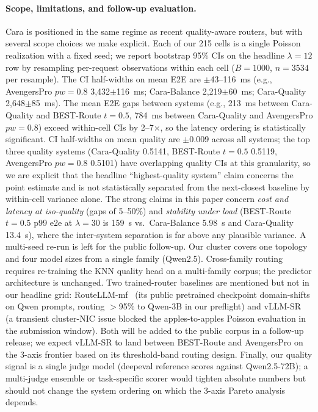 \documentclass[10pt]{article}
\begin{document}
\paragraph{Scope, limitations, and follow-up evaluation.}\label{sec:limitations}
Cara is positioned in the same regime as recent quality-aware routers, but with several scope choices we make explicit. Each of our 215 cells is a single Poisson realization with a fixed seed; we report bootstrap 95\% CIs on the headline $\lambda{=}12$ row by resampling per-request observations within each cell ($B{=}1000$, $n{=}3534$ per resample). The CI half-widths on mean E2E are $\pm$43--116~ms (e.g., AvengersPro $pw{=}0.8$ 3{,}432$\pm$116~ms; Cara-Balance 2{,}219$\pm$60~ms; Cara-Quality 2{,}648$\pm$85~ms). The mean E2E gaps between systems (e.g., 213~ms between Cara-Quality and BEST-Route $t{=}0.5$, 784~ms between Cara-Quality and AvengersPro $pw{=}0.8$) exceed within-cell CIs by 2--7$\times$, so the latency ordering is statistically significant. CI half-widths on mean quality are $\pm$0.009 across all systems; the top three quality systems (Cara-Quality 0.5141, BEST-Route $t{=}0.5$ 0.5119, AvengersPro $pw{=}0.8$ 0.5101) have overlapping quality CIs at this granularity, so we are explicit that the headline ``highest-quality system'' claim concerns the point estimate and is not statistically separated from the next-closest baseline by within-cell variance alone. The strong claims in this paper concern \emph{cost and latency at iso-quality} (gaps of 5--50\%) and \emph{stability under load} (BEST-Route $t{=}0.5$ p99 e2e at $\lambda{=}30$ is 159~s vs.\ Cara-Balance 5.98~s and Cara-Quality 13.4~s), where the inter-system separation is far above any plausible variance. A multi-seed re-run is left for the public follow-up. Our cluster covers one topology and four model sizes from a single family (Qwen2.5). Cross-family routing requires re-training the KNN quality head on a multi-family corpus; the predictor architecture is unchanged. Two trained-router baselines are mentioned but not in our headline grid: RouteLLM-mf~\cite{Ong2024RouteLLMLT} (its public pretrained checkpoint domain-shifts on Qwen prompts, routing $>$95\% to Qwen-3B in our preflight) and vLLM-SR~\cite{semantic_router} (a transient cluster-NIC issue blocked the apples-to-apples Poisson evaluation in the submission window). Both will be added to the public corpus in a follow-up release; we expect vLLM-SR to land between BEST-Route and AvengersPro on the 3-axis frontier based on its threshold-band routing design. Finally, our quality signal is a single judge model (deepeval reference scores against Qwen2.5-72B); a multi-judge ensemble or task-specific scorer would tighten absolute numbers but should not change the system ordering on which the 3-axis Pareto analysis depends.
\end{document}
